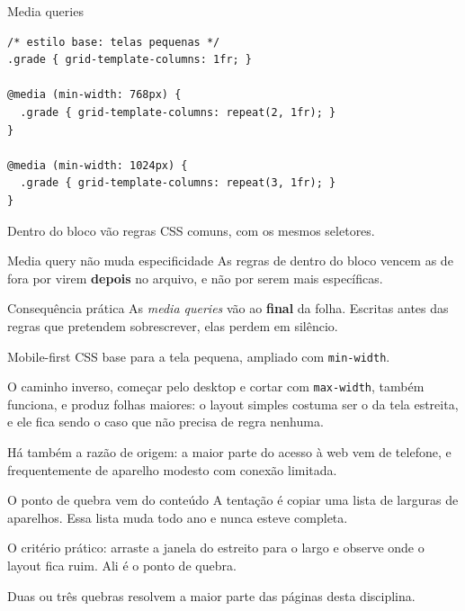 \documentclass{beamer}
\begin{document}
\begin{frame}[fragile]{Media queries}
	\begin{verbatim}
/* estilo base: telas pequenas */
.grade { grid-template-columns: 1fr; }

@media (min-width: 768px) {
  .grade { grid-template-columns: repeat(2, 1fr); }
}

@media (min-width: 1024px) {
  .grade { grid-template-columns: repeat(3, 1fr); }
}
  \end{verbatim}

	\vspace{0.2cm}
	Dentro do bloco vão regras CSS comuns, com os mesmos seletores.
\end{frame}

\begin{frame}{Media query não muda especificidade}
	As regras de dentro do bloco vencem as de fora por virem \textbf{depois} no
	arquivo, e não por serem mais específicas.

	\vspace{0.4cm}
	\begin{block}{Consequência prática}
		As \emph{media queries} vão ao \textbf{final} da folha. Escritas antes das
		regras que pretendem sobrescrever, elas perdem em silêncio.
	\end{block}
\end{frame}

\begin{frame}{Mobile-first}
	CSS base para a tela pequena, ampliado com \texttt{min-width}.

	\vspace{0.4cm}
	O caminho inverso, começar pelo desktop e cortar com \texttt{max-width},
	também funciona, e produz folhas maiores: o layout simples costuma ser o da
	tela estreita, e ele fica sendo o caso que não precisa de regra nenhuma.

	\vspace{0.4cm}
	Há também a razão de origem: a maior parte do acesso à web vem de telefone, e
	frequentemente de aparelho modesto com conexão limitada.
\end{frame}

\begin{frame}{O ponto de quebra vem do conteúdo}
	A tentação é copiar uma lista de larguras de aparelhos. Essa lista muda todo
	ano e nunca esteve completa.

	\vspace{0.4cm}
	O critério prático: arraste a janela do estreito para o largo e observe onde o
	layout fica ruim. Ali é o ponto de quebra.

	\vspace{0.4cm}
	Duas ou três quebras resolvem a maior parte das páginas desta disciplina.
\end{frame}
\end{document}
